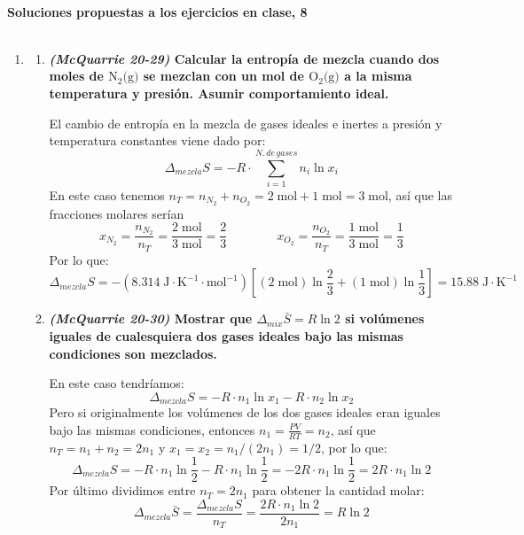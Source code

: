 \documentclass[a4paper,12pt]{article}
\begin{document}

\begin{center}
\HRule \\[0.4cm]
{ \bfseries Soluciones propuestas a los ejercicios en clase, 8}\\ %
\HRule \\[0.4cm]
\end{center}


\begin{enumerate}

 \item 
 \begin{enumerate}
  \item \textbf{\textit{(McQuarrie 20-29)} Calcular la entrop\'ia de mezcla cuando dos moles de $\mbox{N}_2\mbox{(g)}$ se mezclan con un mol de $\mbox{O}_2\mbox{(g)}$ a la misma temperatura y presi\'on. Asumir comportamiento ideal.} %

El cambio de entrop\'ia en la mezcla de gases ideales e inertes a presi\'on y temperatura constantes viene dado por:
$$\Delta_{mezcla}S=-R\cdot\sum_{i=1}^{N.\,de\,gases}n_i\ln x_i$$
En este caso tenemos $n_T=n_{N_2}+n_{O_2}=2\;\mbox{mol}+1\;\mbox{mol}=3\;\mbox{mol}$, as\'i que las fracciones molares ser\'ian 
$$x_{N_2}=\frac{n_{N_2}}{n_T}=\frac{2\;\mbox{mol}}{3\;\mbox{mol}}=\frac{2}{3}\quad\quad\quad\quad x_{O_2}=\frac{n_{O_2}}{n_T}=\frac{1\;\mbox{mol}}{3\;\mbox{mol}}=\frac{1}{3}$$
Por lo que:
$$\Delta_{mezcla}S=-(8.314\;\mbox{J}\cdot\mbox{K}^{-1}\cdot\mbox{mol}^{-1})\left[(2\;\mbox{mol})\ln\frac{2}{3}+(1\;\mbox{mol})\ln\frac{1}{3}\right]=15.88\;\mbox{J}\cdot\mbox{K}^{-1}$$

  \item \textbf{\textit{(McQuarrie 20-30)} Mostrar que $\Delta_{mix}\bar{S}=R\ln 2$ si vol\'umenes iguales de cualesquiera dos gases ideales bajo las mismas condiciones son mezclados.} %

En este caso tendr\'iamos:
$$\Delta_{mezcla}S=-R\cdot n_1\ln x_1-R\cdot n_2\ln x_2$$
Pero si originalmente los vol\'umenes de los dos gases ideales eran iguales bajo las mismas condiciones, entonces $n_1=\frac{PV}{RT}=n_2$, as\'i que $n_T=n_1+n_2=2n_1$ y $x_1=x_2=n_1/(2n_1)=1/2$, por lo que:
$$\Delta_{mezcla}S=-R\cdot n_1\ln\frac{1}{2}-R\cdot n_1\ln\frac{1}{2}=-2R\cdot n_1\ln\frac{1}{2}=2R\cdot n_1\ln 2$$
Por \'ultimo dividimos entre $n_T=2n_1$ para obtener la cantidad molar:
$$\Delta_{mezcla}\bar{S}=\frac{\Delta_{mezcla}S}{n_T}=\frac{2R\cdot n_1\ln2}{2n_1}=R\ln 2$$


\end{enumerate}
\end{enumerate}
\end{document}
